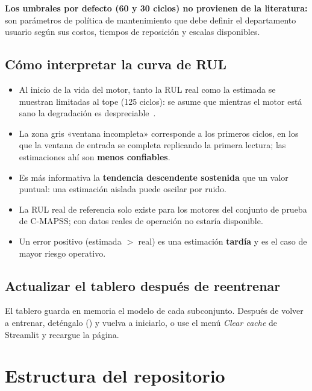 \documentclass[letterpaper]{article}
\newcommand{\cmd}[1]{\texttt{\detokenize{#1}}}
\begin{document}
\textbf{Los umbrales por defecto (60 y 30 ciclos) no provienen de la
literatura:} son parámetros de política de mantenimiento que debe definir el
departamento usuario según sus costos, tiempos de reposición y escalas
disponibles.

\subsection{Cómo interpretar la curva de RUL}

\begin{itemize}
    \item Al inicio de la vida del motor, tanto la RUL real como la estimada se
          muestran limitadas al tope (125 ciclos): se asume que mientras el motor
          está sano la degradación es despreciable~\cite{heimes2008rnn}.
    \item La zona gris «ventana incompleta» corresponde a los primeros ciclos,
          en los que la ventana de entrada se completa replicando la primera
          lectura; las estimaciones ahí son \textbf{menos confiables}.
    \item Es más informativa la \textbf{tendencia descendente sostenida} que un
          valor puntual: una estimación aislada puede oscilar por ruido.
    \item La RUL real de referencia solo existe para los motores del conjunto de
          prueba de C-MAPSS; con datos reales de operación no estaría disponible.
    \item Un error positivo (estimada $>$ real) es una estimación \textbf{tardía}
          y es el caso de mayor riesgo operativo.
\end{itemize}

\subsection{Actualizar el tablero después de reentrenar}

El tablero guarda en memoria el modelo de cada subconjunto. Después de volver a
entrenar, deténgalo (\cmd{Ctrl+C}) y vuelva a iniciarlo, o use el menú
\textit{Clear cache} de Streamlit y recargue la página.

\section{Estructura del repositorio}
\label{sec:estructura}
\end{document}
